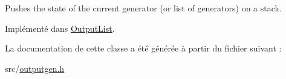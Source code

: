 Pushes the state of the current generator (or list of generators) on a stack. 

Implémenté dans \hyperlink{class_output_list_a885957a64f7d87aefb663c4ec903188f}{Output\+List}.



La documentation de cette classe a été générée à partir du fichier suivant \+:\begin{DoxyCompactItemize}
\item 
src/\hyperlink{outputgen_8h}{outputgen.\+h}\end{DoxyCompactItemize}
